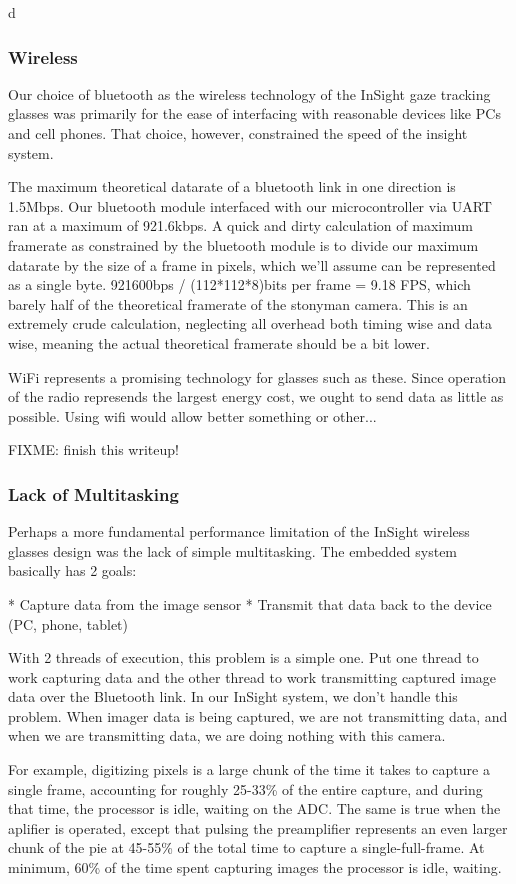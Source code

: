 d\subsubsection{Wireless}

Our choice of bluetooth as the wireless technology of the InSight gaze tracking glasses was primarily for the ease of interfacing with reasonable devices like PCs and cell phones.  That choice, however, constrained the speed of the insight system.

The maximum theoretical datarate of a bluetooth link in one direction is 1.5Mbps.  Our bluetooth module interfaced with our microcontroller via UART ran at a maximum of 921.6kbps.  A quick and dirty calculation of maximum framerate as constrained by the bluetooth module is to divide our maximum datarate by the size of a frame in pixels, which we'll assume can be represented as a single byte.  921600bps / (112*112*8)bits per frame = 9.18 FPS, which barely half of the theoretical framerate of the stonyman camera.  This is an extremely crude calculation, neglecting all overhead both timing wise and data wise, meaning the actual theoretical framerate should be a bit lower.

WiFi represents a promising technology for glasses such as these.  Since operation of the radio represends the largest energy cost, we ought to send data as little as possible.  Using wifi would allow better something or other...

FIXME: finish this writeup!

\subsubsection{Lack of Multitasking}

Perhaps a more fundamental performance limitation of the InSight wireless glasses design was the lack of simple multitasking.  The embedded system basically has 2 goals:

  * Capture data from the image sensor
  * Transmit that data back to the device (PC, phone, tablet)

With 2 threads of execution, this problem is a simple one.  Put one thread to work capturing data and the other thread to work transmitting captured image data over the Bluetooth link.  In our InSight system, we don't handle this problem.  When imager data is being captured, we are not transmitting data, and when we are transmitting data, we are doing nothing with this camera.

For example, digitizing pixels is a large chunk of the time it takes to capture a single frame, accounting for roughly 25-33\% of the entire capture, and during that time, the processor is idle, waiting on the ADC.  The same is true when the aplifier is operated, except that pulsing the preamplifier represents an even larger chunk of the pie at 45-55\% of the total time to capture a single-full-frame.  At minimum, 60\% of the time spent capturing images the processor is idle, waiting.

